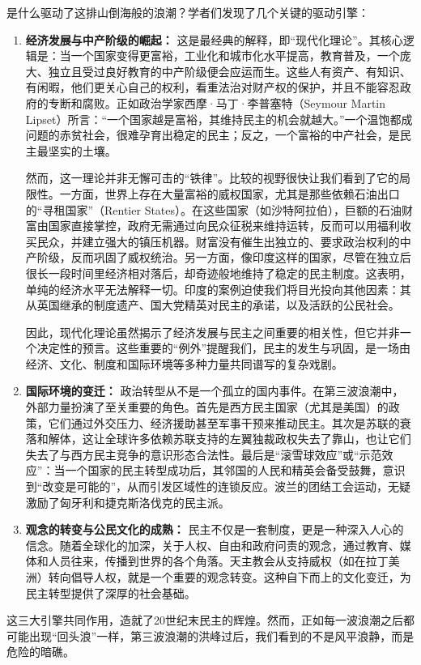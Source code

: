 \documentclass[a5paper, 11pt, openany]{ctexbook}
\begin{document}
是什么驱动了这排山倒海般的浪潮？学者们发现了几个关键的驱动引擎：
\begin{enumerate}
    \item \textbf{经济发展与中产阶级的崛起：} 这是最经典的解释，即“现代化理论”。其核心逻辑是：当一个国家变得更富裕，工业化和城市化水平提高，教育普及，一个庞大、独立且受过良好教育的中产阶级便会应运而生。这些人有资产、有知识、有闲暇，他们更关心自己的权利，看重法治对财产权的保护，并且不能容忍政府的专断和腐败。正如政治学家西摩·马丁·李普塞特（Seymour Martin Lipset）所言：“一个国家越是富裕，其维持民主的机会就越大。”一个温饱都成问题的赤贫社会，很难孕育出稳定的民主；反之，一个富裕的中产社会，是民主最坚实的土壤。

    然而，这一理论并非无懈可击的“铁律”。比较的视野很快让我们看到了它的局限性。一方面，世界上存在大量富裕的威权国家，尤其是那些依赖石油出口的“寻租国家”（Rentier States）。在这些国家（如沙特阿拉伯），巨额的石油财富由国家直接掌控，政府无需通过向民众征税来维持运转，反而可以用福利收买民众，并建立强大的镇压机器。财富没有催生出独立的、要求政治权利的中产阶级，反而巩固了威权统治。另一方面，像印度这样的国家，尽管在独立后很长一段时间里经济相对落后，却奇迹般地维持了稳定的民主制度。这表明，单纯的经济水平无法解释一切。印度的案例迫使我们将目光投向其他因素：其从英国继承的制度遗产、国大党精英对民主的承诺，以及活跃的公民社会。

    因此，现代化理论虽然揭示了经济发展与民主之间重要的相关性，但它并非一个决定性的预言。这些重要的“例外”提醒我们，民主的发生与巩固，是一场由经济、文化、制度和国际环境等多种力量共同谱写的复杂戏剧。

    \item \textbf{国际环境的变迁：} 政治转型从不是一个孤立的国内事件。在第三波浪潮中，外部力量扮演了至关重要的角色。首先是西方民主国家（尤其是美国）的政策，它们通过外交压力、经济援助甚至军事干预来推动民主。其次是苏联的衰落和解体，这让全球许多依赖苏联支持的左翼独裁政权失去了靠山，也让它们失去了与西方民主竞争的意识形态合法性。最后是“滚雪球效应”或“示范效应”：当一个国家的民主转型成功后，其邻国的人民和精英会备受鼓舞，意识到“改变是可能的”，从而引发区域性的连锁反应。波兰的团结工会运动，无疑激励了匈牙利和捷克斯洛伐克的民主派。

    \item \textbf{观念的转变与公民文化的成熟：} 民主不仅是一套制度，更是一种深入人心的信念。随着全球化的加深，关于人权、自由和政府问责的观念，通过教育、媒体和人员往来，传播到世界的各个角落。天主教会从支持威权（如在拉丁美洲）转向倡导人权，就是一个重要的观念转变。这种自下而上的文化变迁，为民主转型提供了深厚的社会基础。
\end{enumerate}
这三大引擎共同作用，造就了20世纪末民主的辉煌。然而，正如每一波浪潮之后都可能出现“回头浪”一样，第三波浪潮的洪峰过后，我们看到的不是风平浪静，而是危险的暗礁。
\end{document}
